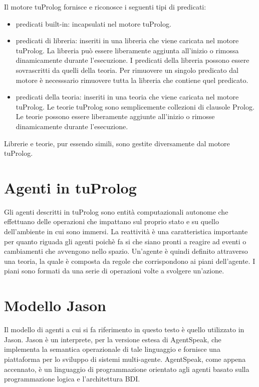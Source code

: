 \documentclass[12pt,a4paper,openright,twoside]{report}
\begin{document}
Il motore tuProlog fornisce e riconosce i seguenti tipi di predicati:
\begin{itemize}
  \item predicati built-in: incapsulati nel motore tuProlog.
  \item predicati di libreria: inseriti in una libreria che viene caricata nel motore tuProlog. La libreria pu\`o essere liberamente aggiunta all'inizio o rimossa dinamicamente durante l'esecuzione. I predicati della libreria possono essere sovrascritti da quelli della teoria. Per rimuovere un singolo predicato dal motore \`e necesssario rimuovere tutta la libreria che contiene quel predicato.
  \item predicati della teoria: inseriti in una teoria che viene caricata nel motore tuProlog. Le teorie tuProlog sono semplicemente collezioni di clausole Prolog. Le teorie possono essere liberamente aggiunte all'inizio o rimosse dinamicamente durante l'esecuzione.
\end{itemize}

Librerie e teorie, pur essendo simili, sono gestite diversamente dal motore tuProlog.

\section{Agenti in tuProlog}
Gli agenti descritti in tuProlog sono entit\`a computazionali autonome che effettuano delle operazioni che impattano sul proprio stato e su quello dell'ambiente in cui sono immersi. La reattivit\`a \`e una caratteristica importante per quanto riguada gli agenti poich\`e fa si che siano pronti a reagire ad eventi o cambiamenti che avvengono nello spazio.
Un'agente \`e quindi definito attraverso una teoria, la quale \`e composta da regole che corrispondono ai piani dell'agente. I piani sono formati da una serie di operazioni volte a svolgere un'azione.

\section{Modello Jason}
Il modello di agenti a cui si fa riferimento in questo testo \`e quello utilizzato in Jason. Jason \`e un interprete, per la versione estesa di AgentSpeak, che implementa la semantica operazionale di tale linguaggio e fornisce una piattaforma per lo sviluppo di sistemi multi-agente. AgentSpeak, come appena accennato, \`e un linguaggio di programmazione orientato agli agenti basato sulla programmazione logica e l'architettura BDI.
\end{document}
